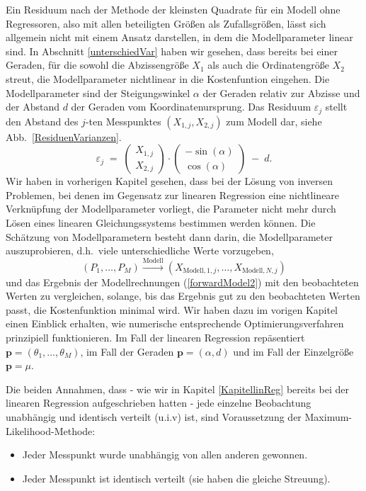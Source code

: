 Ein Residuum nach der Methode der kleinsten Quadrate für ein Modell ohne Regressoren,
also mit allen beteiligten Größen als Zufallsgrößen, lässt sich allgemein nicht mit
einem Ansatz darstellen, in dem die Modellparameter linear sind. In Abschnitt
\ref{unterschiedVar} haben wir gesehen, dass bereits bei einer
Geraden, für die sowohl die Abzissengröße $X_1$ als auch die Ordinatengröße $X_2$ streut,
die Modellparameter nichtlinear in die Kostenfuntion eingehen.
Die Modellparameter sind der Steigungswinkel $\alpha$ der Geraden relativ zur Abzisse und
der Abstand $d$ der Geraden vom Koordinatenursprung. Das Residuum $\varepsilon_j$ stellt den
Abstand des $j$-ten Messpunktes $(X_{1,j}, X_{2,j})$ zum Modell dar, siehe Abb.~\ref{ResiduenVarianzen}.
\begin{equation}
\varepsilon_j \; = \;
\left(\begin{array}{c} X_{1,j}\\ X_{2,j}\end{array}\right) \cdot
\left(\begin{array}{c} -\sin(\alpha)\\ \cos(\alpha)\end{array}\right) \; - \; d .
\label{TLSgerade4}
\end{equation}
Wir haben in vorherigen Kapitel gesehen, dass
bei der Lösung von inversen Problemen, bei denen im Gegensatz zur linearen
Regression eine nichtlineare Verknüpfung der Modellparameter vorliegt,
die Parameter nicht mehr durch Lösen eines linearen Gleichungssystems
bestimmen werden können.
Die Schätzung von Modellparametern besteht dann darin, die Modellparameter auszuprobieren,
d.h.\ viele unterschiedliche Werte vorzugeben,
\begin{equation}
(P_1, \dots, P_M) \xrightarrow{\mathrm{Modell}} (X_{\mathrm{Modell},1,j}, \dots, X_{\mathrm{Modell},N,j})
\label{forwardModel2}
\end{equation}
 und das Ergebnis der
Modellrechnungen (\ref{forwardModel2}) mit den beobachteten Werten zu vergleichen, solange,
bis das Ergebnis \glqq gut zu den beobachteten Werten passt\grqq, die Kostenfunktion minimal wird.
Wir haben dazu im vorigen Kapitel einen Einblick erhalten, wie numerische entsprechende
Optimierungsverfahren prinzipiell funktionieren.
Im Fall der linearen Regression repäsentiert $\mathbf{p} = (\theta_1,\dots,\theta_M)$,
im Fall der Geraden $\mathbf{p} = (\alpha, d)$ und im Fall der Einzelgröße
$\mathbf{p} = \mu$.

Die beiden Annahmen, dass - wie wir in Kapitel \ref{KapitellinReg} bereits bei der linearen Regression
aufgeschrieben hatten - jede einzelne Beobachtung unabhängig und identisch verteilt
(u.i.v) ist, sind Voraussetzung der Maximum-Likelihood-Methode:
\begin{itemize}
\item Jeder Messpunkt wurde unabhängig von allen anderen gewonnen.
\item Jeder Messpunkt ist identisch verteilt (sie haben die gleiche Streuung).
\end{itemize}

